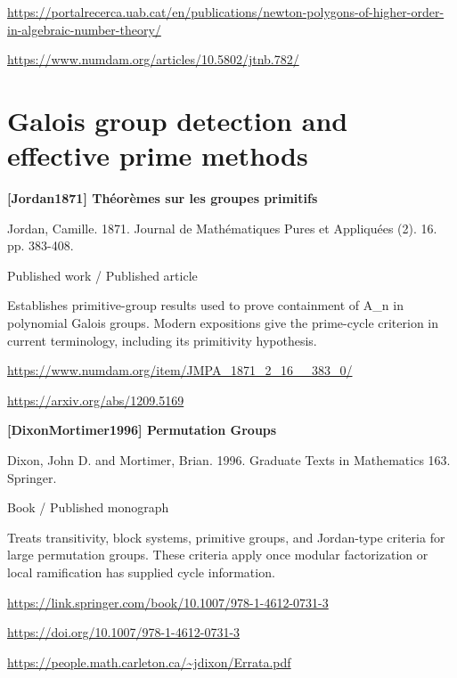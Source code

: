 \documentclass[11pt,a4paper,oneside,openany]{book}
\begin{document}
{\footnotesize\url{https://portalrecerca.uab.cat/en/publications/newton-polygons-of-higher-order-in-algebraic-number-theory/}}\par
{\footnotesize\url{https://www.numdam.org/articles/10.5802/jtnb.782/}}\par
\vspace{9pt}
\section{Galois group detection and effective prime methods}
\hypertarget{ref:Jordan1871}{}
{\sffamily\bfseries\color{atlasgreen}[Jordan1871] Théorèmes sur les groupes primitifs}\par
\color{black} Jordan, Camille. 1871. Journal de Mathématiques Pures et Appliquées (2). 16. pp. 383-408.\par
{\small\sffamily\color{atlasgold}Published work / Published article}\par
\color{black} Establishes primitive-group results used to prove containment of A\_\allowbreak{}n in polynomial Galois groups. Modern expositions give the prime-cycle criterion in current terminology, including its primitivity hypothesis.\par
{\footnotesize\url{https://www.numdam.org/item/JMPA_1871_2_16__383_0/}}\par
{\footnotesize\url{https://arxiv.org/abs/1209.5169}}\par
\vspace{9pt}
\hypertarget{ref:DixonMortimer1996}{}
{\sffamily\bfseries\color{atlasgreen}[DixonMortimer1996] Permutation Groups}\par
\color{black} Dixon, John D. and Mortimer, Brian. 1996. Graduate Texts in Mathematics 163. Springer.\par
{\small\sffamily\color{atlasgold}Book / Published monograph}\par
\color{black} Treats transitivity, block systems, primitive groups, and Jordan-type criteria for large permutation groups. These criteria apply once modular factorization or local ramification has supplied cycle information.\par
{\footnotesize\url{https://link.springer.com/book/10.1007/978-1-4612-0731-3}}\par
{\footnotesize\url{https://doi.org/10.1007/978-1-4612-0731-3}}\par
{\footnotesize\url{https://people.math.carleton.ca/~jdixon/Errata.pdf}}\par
\end{document}
